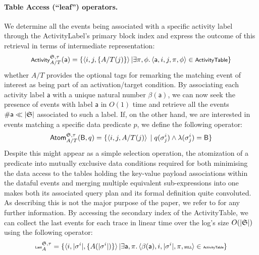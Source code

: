 \documentclass[sigconf]{acmart}
\newcommand{\const}[1]{\ensuremath{\mathsf{#1}}}
\begin{document}
\paragraph{Table Access (``leaf'') operators.} We  determine all the events being associated with a specific activity label through the ActivityLabel's primary block index and express the outcome of this retrieval in terms of intermediate representation:
\[\footnotesize \textsf{Activity}^{\LOG,\tau}_{A/T}(\const{a})=\{\braket{i,j,\{A/T(j)\}}|\exists \pi,\phi.\braket{\const{a},i,j,\pi,\phi}\in\textsf{ActivityTable}\}\]
whether $A/T$ provides the optional tags for remarking the matching event of interest as being part of an activation/target condition. By associating each activity label \const{a} with a unique natural number $\beta(\const{a})$, we can now seek the presence of events with label \const{a} in $O(1)$ time and retrieve all the events $\#{\textsf{a}}\ll |\mathfrak{S}|$ associated to such a label. If, on the other hand, we are interested in events matching a specific data predicate $p$,  we define the following operator:
\[\textsf{Atom}^{\mathfrak{S},\tau}_{A/T}(\textsf{B},q)=\{\braket{i,j,{A/T(j)}}\;|\;q(\sigma^i_j)\wedge \lambda(\sigma^i_j)=\textsf{B}\}\]
Despite this might appear as a simple selection operation, the atomization of a predicate into mutually exclusive data conditions required for both minimising the data access to the tables holding the key-value payload associations within the dataful events and merging multiple equivalent sub-expressions into one makes both its associated query plan and its formal definition quite convoluted. As describing this is not the major purpose of the paper, we refer to \cite{info14030173}
 for any further information. %
By accessing the secondary index of the \textsf{ActivityTable}, we can collect the last events for each trace in linear time over the log's size $O(|\mathfrak{S}|)$ using the following operator:
\[\tiny\textsf{Last}^{\LOG,\tau}_{A}=\{\braket{i,\vert\sigma^i\vert,\{A(\vert\sigma^i\vert)\}}|\exists \const{a}, \pi.\braket{\beta(\const{a}),i,|\sigma^i|,\pi,\texttt{NULL}}\in\textsf{ActivityTable}\}\]
\end{document}
